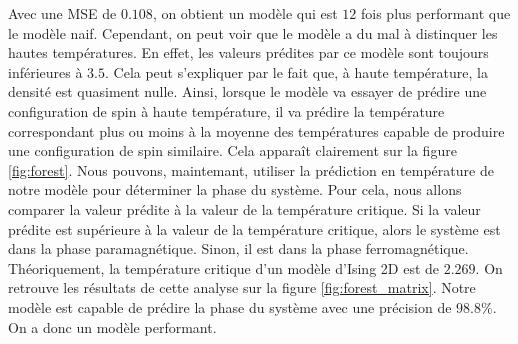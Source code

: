 \documentclass[11pt, parskip=half]{scrartcl} %
\begin{document}
Avec une MSE de $0.108$, on obtient un modèle qui est $12$ fois plus performant que le modèle naif. Cependant, on peut voir que le modèle a du mal à distinquer les hautes températures. En effet, les valeurs prédites par ce modèle sont toujours inférieures à $3.5$.
Cela peut s'expliquer par le fait que, à haute température, la densité est quasiment nulle. Ainsi, lorsque le modèle va essayer de prédire une configuration de spin à haute température, il va prédire la température correspondant plus ou moins à la moyenne des températures capable de produire une configuration de spin similaire. Cela apparaît clairement sur la figure \ref{fig:forest}.
Nous pouvons, maintemant, utiliser la prédiction en température de notre modèle pour déterminer la phase du système. Pour cela, nous allons comparer la valeur prédite à la valeur de la température critique. Si la valeur prédite est supérieure à la valeur de la température critique, alors le système est dans la phase paramagnétique. Sinon, il est dans la phase ferromagnétique.
Théoriquement, la température critique d'un modèle d'Ising 2D est de $2.269$. On retrouve les résultats de cette analyse sur la figure \ref{fig:forest_matrix}.  Notre modèle est capable de prédire la phase du système avec une précision de $98.8\%$. On a donc un modèle performant.
\end{document}
